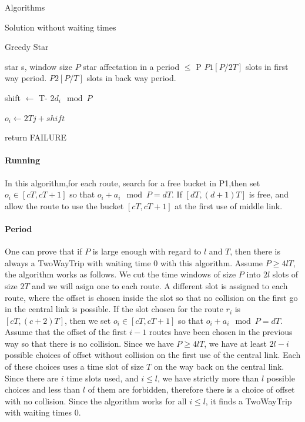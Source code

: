 \documentclass[a4paper,10pt]{report}
\begin{document}
\begin{chapter}{Algorithms}
\begin{section}{Solution without waiting times}
\begin{subsection}{Greedy Star}
 

\begin{algorithm}[H]
\caption{Greedy star assignment algorithm}
\begin{algorithmic}
\REQUIRE star s, window size $P$
\ENSURE star affectation in a period $\leq $ P 
\STATE $P1[P/2T]$ slots in first way period.
\STATE $P2[P/T]$ slots in back way period.



\STATE shift $\leftarrow$ T- 2$d_i \mod P$ 


\STATE $o_i \leftarrow 2Tj + shift$
\ENDIF

\ENDIF

\STATE return FAILURE
\ENDIF
\ENDFOR

\ENDFOR

\end{algorithmic}
\end{algorithm}



\paragraph{Running}
In this algorithm,for each route, search for a free bucket in P1,then set $o_i \in [cT,cT+1]$ so that $o_i + a_i \mod P = dT$.
If $[dT,(d+1)T]$ is free, and allow the route to use the bucket $[cT,cT+1]$ at the first use of middle link.\\


\paragraph{Period}
One can prove that if $P$ is large enough with regard to $l$ and $T$, then there is always a TwoWayTrip
with waiting time $0$ with this algorithm.
 Assume $P \geq 4lT$, the algorithm works as follows. 
We cut the time windows of size $P$ into $2l$ slots of size $2T$ and we will asign one to each route.
A different slot is assigned to each route, where the offset is chosen inside the slot so that 
no collision on the first go in the central link is possible. If the slot chosen for the route $r_i$ is $[cT,(c+2)T]$,
then we set $o_i \in [cT,cT+1]$ so that $o_i + a_i \mod P = dT$. Assume that the offset of the first $i-1$ routes have been 
chosen in the previous way so that there is no collision. Since we have $P \geq 4lT$, we have at least $2l-i$ possible choices of offset without collision on the first use of the central link. Each of these choices uses a time slot of size $T$ on the way back on the central link. Since there are $i$ time slots used, and $i \leq l$, we have strictly more than $l$ possible choices and less than $l$ of them are forbidden, therefore there is a choice of offset with no collision. 
Since the algorithm works for all $i \leq l$, it finds a TwoWayTrip with waiting times $0$. 


\end{subsection}
\end{section}
\end{chapter}
\end{document}
